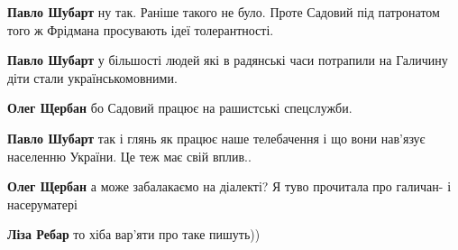 \begin{itemize}
\begin{itemize}
 
\textbf{Павло Шубарт} ну так. Раніше такого не було. Проте Садовий під патронатом того ж Фрідмана просувають ідеї толерантності.

 
\textbf{Павло Шубарт} у більшості людей які в радянські часи потрапили на Галичину діти стали українськомовними.

 
\textbf{Олег Щербан} бо Садовий працює на рашистські спецслужби.

 
\textbf{Павло Шубарт} так і глянь як працює наше телебачення і що вони нав'язує населенню України. Це теж має свій вплив..

 
\textbf{Олег Щербан} а може забалакаємо на діалекті? Я туво прочитала про галичан- і насеруматері

 
\textbf{Ліза Ребар} то хіба вар'яти про таке пишуть))


\end{itemize}
\end{itemize}

